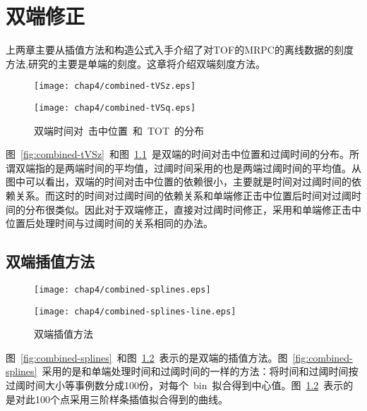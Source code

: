 \chapter{双端修正}
上两章主要从插值方法和构造公式入手介绍了对TOF的MRPC的离线数据的刻度方法,研究的主要是单端的刻度。这章将介绍双端刻度方法。

\begin{figure}[!h]
\begin{minipage}[!h]{0.5\linewidth}
\texttt{[image: chap4/combined-tVSz.eps]}
\label{fig:combined-tVSz}
\end{minipage}%
\hfill
\begin{minipage}[!h]{0.5\linewidth}
\texttt{[image: chap4/combined-tVSq.eps]}
\label{fig:combined-tVSq}
\end{minipage}
\caption{双端时间对~击中位置~和~TOT~的分布}
\end{figure}

图~\ref{fig:combined-tVSz}~和图~\ref{fig:combined-tVSq}~是双端的时间对击中位置和过阈时间的分布。所谓双端指的是两端时间的平均值，过阈时间采用的也是两端过阈时间的平均值。从图中可以看出，双端的时间对击中位置的依赖很小，主要就是时间对过阈时间的依赖关系。而这时的时间对过阈时间的依赖关系和单端修正击中位置后时间对过阈时间的分布很类似。因此对于双端修正，直接对过阈时间修正，采用和单端修正击中位置后处理时间与过阈时间的关系相同的办法。

\section{双端插值方法}

\begin{figure}[!h]
\begin{minipage}[!h]{0.5\linewidth}
\texttt{[image: chap4/combined-splines.eps]}
\label{fig:combined-splines}
\end{minipage}%
\hfill
\begin{minipage}[!h]{0.5\linewidth}
\texttt{[image: chap4/combined-splines-line.eps]}
\label{fig:combined-splines-line}
\end{minipage}
\caption{双端插值方法}
\end{figure}

图~\ref{fig:combined-splines}~和图~\ref{fig:combined-splines-line}~表示的是双端的插值方法。图~\ref{fig:combined-splines}~采用的是和单端处理时间和过阈时间的一样的方法：将时间和过阈时间按过阈时间大小等事例数分成100份，对每个~bin~拟合得到中心值。图~\ref{fig:combined-splines-line}~表示的是对此100个点采用三阶样条插值拟合得到的曲线。

